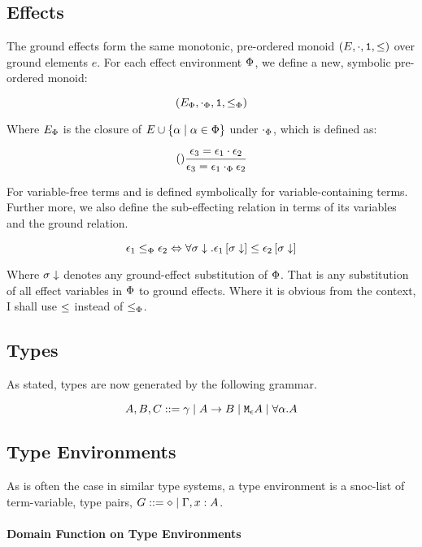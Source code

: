 \documentclass{Report}
\begin{document}
\subsection{Effects}
The ground effects form the same monotonic, pre-ordered monoid $(E, \dot, \1, \subeffect)$ over ground elements $e$. For each effect environment $\P$, we define a new, symbolic pre-ordered monoid:

\begin{equation}
    (E_\P, \dotp, \1, \subeffectp)
\end{equation}

Where $E_\P$ is the closure of $E\cup \left\{\a\mid\a\in\P\right\}$ under $\dotp$, which is defined as:

\begin{equation}
    \treerule{}{\e_3 = \e_1\dot\e_2}{\e_3 = \e_1\dotp\e_2}
\end{equation} 

For variable-free terms and is defined symbolically for variable-containing terms. Further more, we also define the sub-effecting relation in terms of its variables and the ground relation.

\begin{equation}
    \e_1 \subeffectp \e_2 \Leftrightarrow \forall \si\downarrow. \e_1\sub{\si\downarrow} \subeffect \e_2\sub{\si\downarrow}
\end{equation}

Where $\si\downarrow$ denotes any ground-effect substitution of $\P$. That is any substitution of all effect variables in $\P$ to ground effects. Where it is obvious from the context, I shall use $\subeffect$ instead of $\subeffectp$.


\subsection{Types}
As stated, types are now generated by the following grammar.

$$ A, B, C \gens \ground \mid \ab \mid \mea \mid \all{\a}{A}$$
  
\subsection{Type Environments}
As is often the case in similar type systems, a type environment is a snoc-list of term-variable, type pairs, $G \gens \nil \mid \gax$.

\paragraph{Domain Function on Type Environments}
\end{document}
